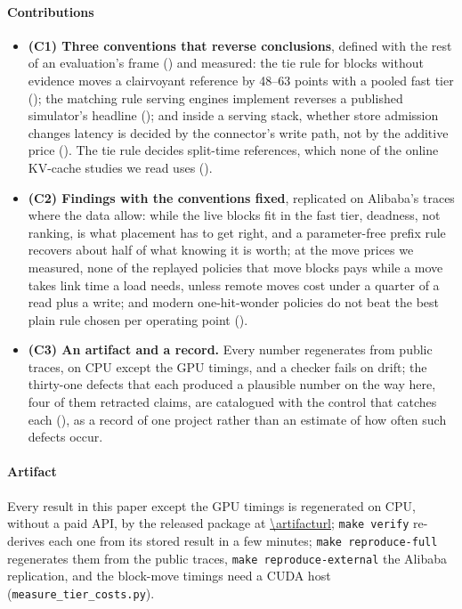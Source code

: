 \paragraph{Contributions}
\begin{itemize}
  \item \textbf{(C1) Three conventions that reverse conclusions}, defined with the rest of an evaluation's
  frame () and measured: the tie rule for blocks without evidence moves a clairvoyant reference
  by 48--63 points with a pooled fast tier (); the matching rule serving engines implement
  reverses a published simulator's headline (); and inside a serving stack, whether store
  admission changes latency is decided by the connector's write path, not by the additive price
  (). The tie rule decides split-time references, which none of the online KV-cache
  studies we read uses ().
  \item \textbf{(C2) Findings with the conventions fixed}, replicated on Alibaba's traces where the data allow:
  while the live blocks fit in the fast tier, deadness, not ranking, is what placement has to get right, and a
  parameter-free prefix rule recovers about half of what knowing it is worth; at the move prices we measured,
  none of the replayed policies that move blocks pays while a move takes link time a load needs, unless
  remote moves cost under a quarter of a read plus a write; and modern
  one-hit-wonder policies do not beat the best plain rule chosen per operating point
  ().
  \item \textbf{(C3) An artifact and a record.} Every number regenerates from public traces, on CPU except the GPU
  timings, and a checker fails on drift; the thirty-one defects that each produced a plausible number on the way here,
  four of them retracted claims, are catalogued with the control that catches each (),
  as a record of one project rather than an estimate of how often such defects occur.
\end{itemize}

{\sloppy\paragraph{Artifact} Every result in this paper except the GPU timings is regenerated on CPU, without a paid API, by the
released package at \url{\artifacturl}; \texttt{make verify} re-derives each one from its stored result
in a few minutes; \texttt{make reproduce-full} regenerates them from the public traces, \texttt{make reproduce-external} the Alibaba replication, and the block-move
timings need a CUDA host (\texttt{measure\_tier\_costs.py}).\par}
